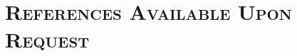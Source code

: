 \documentclass[11pt]{moderncv}
\begin{document}




\section{\textsc{References Available Upon Request}}
\end{document}
